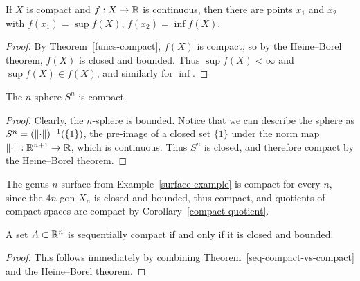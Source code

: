 \begin{cor}
  \label{sup-inf-compact-continuous}
  If $X$ is compact and $f : X \to \mathbb{R}$ is continuous, then there are points $x_1$ and $x_2$ with $f(x_1) = \sup f(X)$, $f(x_2) = \inf f(X)$.
\end{cor}
\begin{proof}
  By Theorem~\ref{funcs-compact}, $f(X)$ is compact, so by the Heine--Borel theorem, $f(X)$ is closed and bounded. Thus $\sup f(X) < \infty$ and $\sup f(X) \in f(X)$, and similarly for $\inf$.
\end{proof}
\begin{cor}
  The $n$-sphere $S^n$ is compact.
\end{cor}
\begin{proof}
  Clearly, the $n$-sphere is bounded. Notice that we can describe the sphere as $S^n = (\lVert \cdot \rVert)^{-1}(\{1\})$, the pre-image of a closed set $\{1\}$ under the norm map $\lVert \cdot \rVert : \mathbb{R}^{n+1} \to \mathbb{R}$, which is continuous. Thus $S^n$ is closed, and therefore compact by the Heine--Borel theorem.
\end{proof}
\begin{example}
  The genus $n$ surface from Example~\ref{surface-example} is compact for every $n$, since the $4n$-gon $X_n$ is closed and bounded, thus compact, and quotients of compact spaces are compact by Corollary~\ref{compact-quotient}.
\end{example}
\begin{thm}
  A set $A \subset \mathbb{R}^n$ is sequentially compact if and only if it is closed and bounded.
\end{thm}
\begin{proof}
  This follows immediately by combining Theorem~\ref{seq-compact-vs-compact} and the Heine--Borel theorem.
\end{proof}
